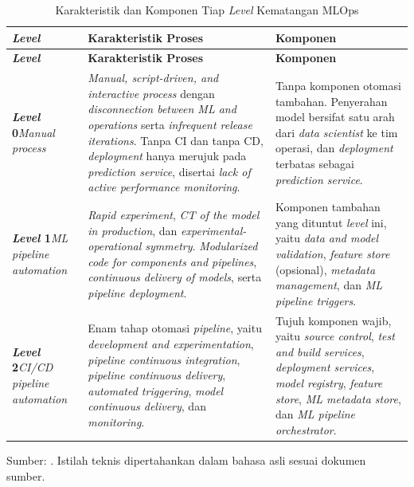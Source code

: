 {
\footnotesize
\setlength{\tabcolsep}{3pt}
\renewcommand{\arraystretch}{1.2}
\setlength{\LTpost}{0pt}
\begin{longtable}{|>{\centering\arraybackslash}m{1.5cm}|>{\raggedright\arraybackslash}m{5.95cm}|>{\raggedright\arraybackslash}m{5.8cm}|}
\caption{Karakteristik dan Komponen Tiap \textit{Level} Kematangan MLOps}
\label{tab:mlops_level_legend} \\
\hline
\textbf{\textit{Level}} & \centering\arraybackslash\textbf{Karakteristik Proses} & \centering\arraybackslash\textbf{Komponen} \\
\hline
\endfirsthead
\hline
\textbf{\textit{Level}} & \centering\arraybackslash\textbf{Karakteristik Proses} & \centering\arraybackslash\textbf{Komponen} \\
\hline
\endhead
\endfoot
\hline
\endlastfoot

\textbf{\textit{Level} 0}\newline \textit{Manual process} & \textit{Manual, script-driven, and interactive process} dengan \textit{disconnection between ML and operations} serta \textit{infrequent release iterations}. Tanpa CI dan tanpa CD, \textit{deployment} hanya merujuk pada \textit{prediction service}, disertai \textit{lack of active performance monitoring}. & Tanpa komponen otomasi tambahan. Penyerahan model bersifat satu arah dari \textit{data scientist} ke tim operasi, dan \textit{deployment} terbatas sebagai \textit{prediction service}. \\
\hline
\textbf{\textit{Level} 1}\newline \textit{ML pipeline automation} & \textit{Rapid experiment}, \textit{CT of the model in production}, dan \textit{experimental-operational symmetry}. \textit{Modularized code for components and pipelines}, \textit{continuous delivery of models}, serta \textit{pipeline deployment}. & Komponen tambahan yang dituntut \textit{level} ini, yaitu \textit{data and model validation}, \textit{feature store} (opsional), \textit{metadata management}, dan \textit{ML pipeline triggers}. \\
\hline
\textbf{\textit{Level} 2}\newline \textit{CI/CD pipeline automation} & Enam tahap otomasi \textit{pipeline}, yaitu \textit{development and experimentation}, \textit{pipeline continuous integration}, \textit{pipeline continuous delivery}, \textit{automated triggering}, \textit{model continuous delivery}, dan \textit{monitoring}. & Tujuh komponen wajib, yaitu \textit{source control}, \textit{test and build services}, \textit{deployment services}, \textit{model registry}, \textit{feature store}, \textit{ML metadata store}, dan \textit{ML pipeline orchestrator}. \\
\hline
\end{longtable}
\par{\footnotesize Sumber: \textcite{googlecloud2024mlops}. Istilah teknis dipertahankan dalam bahasa asli sesuai dokumen sumber.}
}
